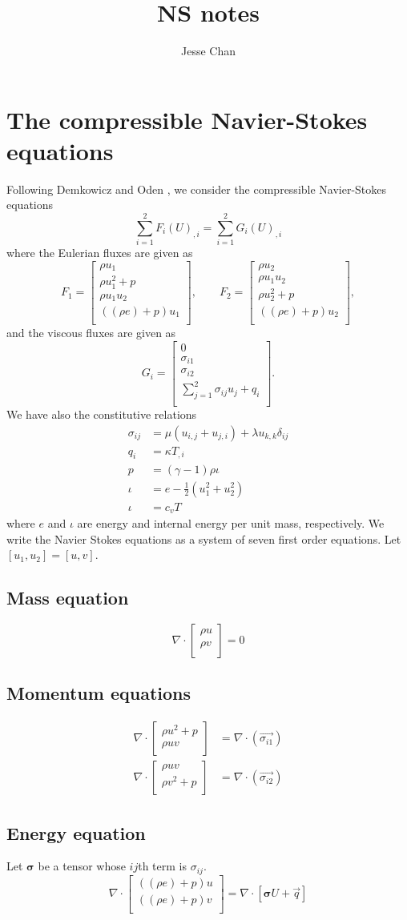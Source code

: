 \documentclass{article}
\date{}
\author{Jesse Chan}
\title{NS notes}
\newcommand{\grad}{\nabla}
\renewcommand{\div}{\grad \cdot}
\def\vecttwo#1#2{\left[
\begin{array}{c}
#1\\
#2\\
\end{array}
\right]}
\def\vectfour#1#2#3#4{\left[
\begin{array}{c}
#1\\
#2\\
#3\\
#4\\
\end{array}
\right]}
\begin{document}
\section{The compressible Navier-Stokes equations}

Following Demkowicz and Oden \cite{Demkowicz:1990:NFE:112271.112276}, we consider the compressible Navier-Stokes equations
\[
\sum^2_{i=1} F_i\left( U\right)_{,i}=\sum^2_{i=1} G_i\left( U\right)_{,i}
\]
where the Eulerian fluxes are given as
\[
F_1 = \vectfour{\rho u_1}{\rho u_1^2+p}{\rho u_1 u_2}{((\rho e)+p)u_1}, \qquad F_2 = \vectfour{\rho u_2}{\rho u_1 u_2}{\rho u_2^2+p}{((\rho e)+p)u_2},
\]
and the viscous fluxes are given as
\[
G_i = \vectfour{0}{\sigma_{i1}}{\sigma_{i2}}{\sum_{j=1}^2\sigma_{ij}u_j + q_i}.
\]
We have also the constitutive relations 
\begin{align*}
\sigma_{ij} &= \mu(u_{i,j}+u_{j,i}) + \lambda u_{k,k}\delta_{ij}\\
q_i &= \kappa T_{,i}\\
p &= (\gamma-1)\rho\iota\\
\iota &= e-\frac{1}{2}(u_1^2+u_2^2)\\
\iota &= c_vT
\end{align*}
where $e$ and $\iota$ are energy and internal energy per unit mass, respectively. We write the Navier Stokes equations as a system of seven first order equations. Let $[u_1,u_2] = [u,v]$. 

\subsection{Mass equation}
\[
\div \vecttwo{\rho u }{\rho v} = 0
\]
\subsection{Momentum equations}
\begin{align*}
\div \vecttwo{\rho u^2+p }{\rho u v} &= \div\left(\vec{\sigma_{i1}}\right)\\
\div \vecttwo{\rho u v}{\rho v^2+p } &= \div\left(\vec{\sigma_{i2}}\right)
\end{align*}
\subsection{Energy equation}
Let $\boldsymbol \sigma$ be a tensor whose $ij$th term is $\sigma_{ij}$.  
\[
\div\vecttwo{((\rho e)+p)u}{((\rho e)+p)v} = \div\left[\boldsymbol\sigma U + \vec{q}\right]
\]
\end{document}
